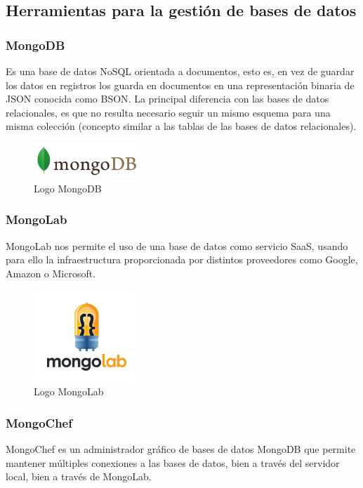 	\subsection{Herramientas para la gestión de bases de datos}
		\subsubsection{MongoDB}
		Es una base de datos NoSQL orientada a documentos, esto es, en vez de guardar los datos en registros los guarda en documentos en una representación binaria de \ac{JSON} conocida como \ac{BSON}. La principal diferencia con las bases de datos relacionales, es que no resulta necesario seguir un mismo esquema para una misma colección (concepto similar a las tablas de las bases de datos relacionales).
		
		\begin{figure}[H]
		\centering
		\includegraphics[width=40mm, fbox={\fboxrule} 4mm]{images/04-metodo/31-mongodb_logo.png}
		\caption{Logo MongoDB}
		\label{fig:mongodb-logo}
		\end{figure}	
		
		\subsubsection{MongoLab}
		MongoLab nos permite el uso de una base de datos como servicio \ac{SaaS}, usando para ello la infraestructura proporcionada por distintos proveedores como Google, Amazon o Microsoft.
				
		\begin{figure}[H]
		\centering
		\includegraphics[width=40mm, fbox={\fboxrule} 4mm]{images/04-metodo/33-mongolab-logo.png}
		\caption{Logo MongoLab}
		\label{fig:mongolab-logo}
		\end{figure}
		
		\subsubsection{MongoChef}
		MongoChef es un administrador gráfico de bases de datos MongoDB que permite mantener múltiples conexiones a las bases de datos, bien a través del servidor local, bien a través de MongoLab.
		
